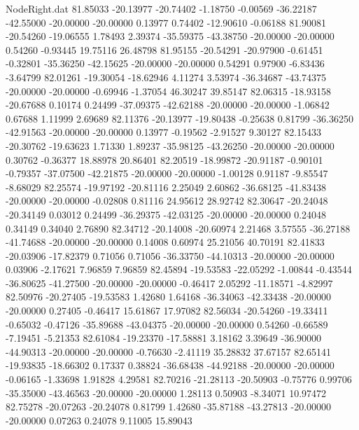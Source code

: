 \begin{filecontents}{NodeRight.dat}
  81.85033  -20.13977  -20.74402    -1.18750   -0.00569  -36.22187  -42.55000  -20.00000  -20.00000    0.13977    0.74402  -12.90610   -0.06188
  81.90081  -20.54260  -19.06555     1.78493    2.39374  -35.59375  -43.38750  -20.00000  -20.00000    0.54260   -0.93445   19.75116   26.48798
  81.95155  -20.54291  -20.97900    -0.61451   -0.32801  -35.36250  -42.15625  -20.00000  -20.00000    0.54291    0.97900   -6.83436   -3.64799
  82.01261  -19.30054  -18.62946     4.11274    3.53974  -36.34687  -43.74375  -20.00000  -20.00000   -0.69946   -1.37054   46.30247   39.85147
  82.06315  -18.93158  -20.67688     0.10174    0.24499  -37.09375  -42.62188  -20.00000  -20.00000   -1.06842    0.67688    1.11999    2.69689
  82.11376  -20.13977  -19.80438    -0.25638    0.81799  -36.36250  -42.91563  -20.00000  -20.00000    0.13977   -0.19562   -2.91527    9.30127
  82.15433  -20.30762  -19.63623     1.71330    1.89237  -35.98125  -43.26250  -20.00000  -20.00000    0.30762   -0.36377   18.88978   20.86401
  82.20519  -18.99872  -20.91187    -0.90101   -0.79357  -37.07500  -42.21875  -20.00000  -20.00000   -1.00128    0.91187   -9.85547   -8.68029
  82.25574  -19.97192  -20.81116     2.25049    2.60862  -36.68125  -41.83438  -20.00000  -20.00000   -0.02808    0.81116   24.95612   28.92742
  82.30647  -20.24048  -20.34149     0.03012    0.24499  -36.29375  -42.03125  -20.00000  -20.00000    0.24048    0.34149    0.34040    2.76890
  82.34712  -20.14008  -20.60974     2.21468    3.57555  -36.27188  -41.74688  -20.00000  -20.00000    0.14008    0.60974   25.21056   40.70191
  82.41833  -20.03906  -17.82379     0.71056    0.71056  -36.33750  -44.10313  -20.00000  -20.00000    0.03906   -2.17621    7.96859    7.96859
  82.45894  -19.53583  -22.05292    -1.00844   -0.43544  -36.80625  -41.27500  -20.00000  -20.00000   -0.46417    2.05292  -11.18571   -4.82997
  82.50976  -20.27405  -19.53583     1.42680    1.64168  -36.34063  -42.33438  -20.00000  -20.00000    0.27405   -0.46417   15.61867   17.97082
  82.56034  -20.54260  -19.33411    -0.65032   -0.47126  -35.89688  -43.04375  -20.00000  -20.00000    0.54260   -0.66589   -7.19451   -5.21353
  82.61084  -19.23370  -17.58881     3.18162    3.39649  -36.90000  -44.90313  -20.00000  -20.00000   -0.76630   -2.41119   35.28832   37.67157
  82.65141  -19.93835  -18.66302     0.17337    0.38824  -36.68438  -44.92188  -20.00000  -20.00000   -0.06165   -1.33698    1.91828    4.29581
  82.70216  -21.28113  -20.50903    -0.75776    0.99706  -35.35000  -43.46563  -20.00000  -20.00000    1.28113    0.50903   -8.34071   10.97472
  82.75278  -20.07263  -20.24078     0.81799    1.42680  -35.87188  -43.27813  -20.00000  -20.00000    0.07263    0.24078    9.11005   15.89043

\end{filecontents}
